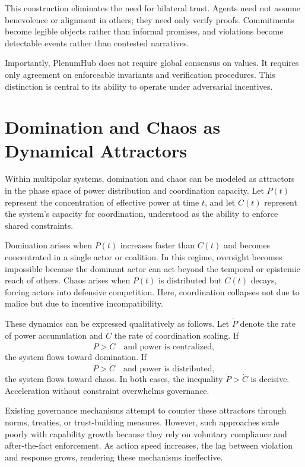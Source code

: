 \documentclass[11pt,oneside]{article}
\begin{document}
This construction eliminates the need for bilateral trust. Agents need not assume benevolence or alignment in others; they need only verify proofs. Commitments become legible objects rather than informal promises, and violations become detectable events rather than contested narratives.

Importantly, PlenumHub does not require global consensus on values. It requires only agreement on enforceable invariants and verification procedures. This distinction is central to its ability to operate under adversarial incentives.

\section{Domination and Chaos as Dynamical Attractors}

Within multipolar systems, domination and chaos can be modeled as attractors in the phase space of power distribution and coordination capacity. Let \( P(t) \) represent the concentration of effective power at time \( t \), and let \( C(t) \) represent the system’s capacity for coordination, understood as the ability to enforce shared constraints.

Domination arises when \( P(t) \) increases faster than \( C(t) \) and becomes concentrated in a single actor or coalition. In this regime, oversight becomes impossible because the dominant actor can act beyond the temporal or epistemic reach of others. Chaos arises when \( P(t) \) is distributed but \( C(t) \) decays, forcing actors into defensive competition. Here, coordination collapses not due to malice but due to incentive incompatibility.

These dynamics can be expressed qualitatively as follows. Let \( \dot{P} \) denote the rate of power accumulation and \( \dot{C} \) the rate of coordination scaling. If
\[
\dot{P} > \dot{C} \quad \text{and power is centralized},
\]
the system flows toward domination. If
\[
\dot{P} > \dot{C} \quad \text{and power is distributed},
\]
the system flows toward chaos. In both cases, the inequality \( \dot{P} > \dot{C} \) is decisive. Acceleration without constraint overwhelms governance.

Existing governance mechanisms attempt to counter these attractors through norms, treaties, or trust-building measures. However, such approaches scale poorly with capability growth because they rely on voluntary compliance and after-the-fact enforcement. As action speed increases, the lag between violation and response grows, rendering these mechanisms ineffective.
\end{document}
